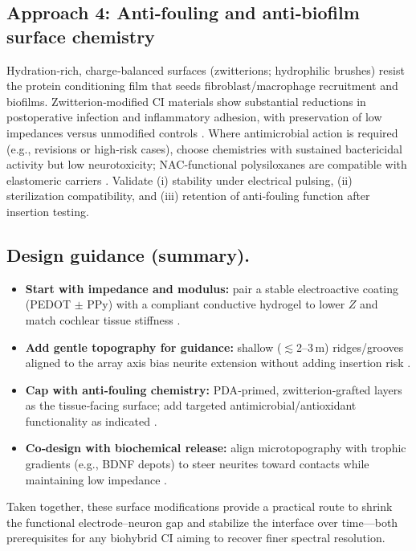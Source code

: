 \documentclass[referee,pdflatex, sn-vancouver-num]{sn-jnl}%
\theoremstyle{thmstyleone}%
\theoremstyle{thmstyletwo}%
\theoremstyle{thmstylethree}%
\begin{document}
\subsection{Approach 4: Anti‑fouling and anti‑biofilm surface chemistry}
Hydration‑rich, charge‑balanced surfaces (zwitterions; hydrophilic brushes) resist the protein conditioning film that seeds fibroblast/macrophage recruitment and biofilms. Zwitterion‑modified CI materials show substantial reductions in postoperative infection and inflammatory adhesion, with preservation of low impedances versus unmodified controls \cite{Chen2023-ba,Horne2023}. Where antimicrobial action is required (e.g., revisions or high‑risk cases), choose chemistries with sustained bactericidal activity but low neurotoxicity; NAC‑functional polysiloxanes are compatible with elastomeric carriers \cite{Cozma2021-jb}. Validate (i) stability under electrical pulsing, (ii) sterilization compatibility, and (iii) retention of anti‑fouling function after insertion testing.

\subsection{Design guidance (summary).}
\begin{itemize}
  \item \textbf{Start with impedance and modulus:} pair a stable electroactive coating (PEDOT $\pm$ PPy) with a compliant conductive hydrogel to lower $Z$ and match cochlear tissue stiffness \cite{Venkatraman2011-ql,Goding2017,Dalrymple2020,Green2012}.
  \item \textbf{Add gentle topography for guidance:} shallow ($\lesssim$2–3\,\textmu m) ridges/grooves aligned to the array axis bias neurite extension without adding insertion risk \cite{Wang2013,Chen2014,Lee2019}.
  \item \textbf{Cap with anti‑fouling chemistry:} PDA‑primed, zwitterion‑grafted layers as the tissue‑facing surface; add targeted antimicrobial/antioxidant functionality as indicated \cite{Horne2023,Chen2023-ba,Cozma2021-jb,Schendzielorz2017}.
  \item \textbf{Co‑design with biochemical release:} align microtopography with trophic gradients (e.g., BDNF depots) to steer neurites toward contacts while maintaining low impedance \cite{Chikar2012,Richardson2009,Goding2017}.
\end{itemize}
Taken together, these surface modifications provide a practical route to shrink the functional electrode–neuron gap and stabilize the interface over time—both prerequisites for any biohybrid CI aiming to recover finer spectral resolution.
\end{document}
